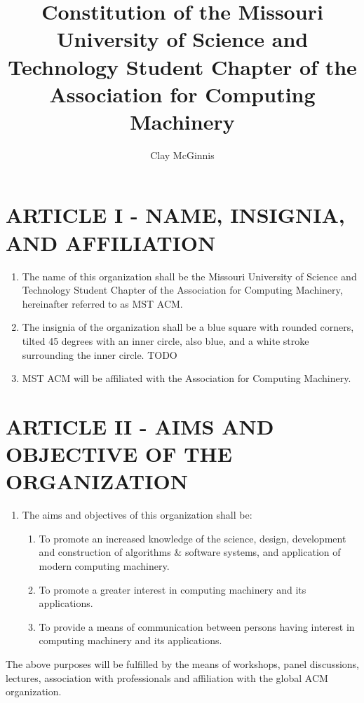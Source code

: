\documentclass[11pt,a4paper,notitlepage]{article}
\author{Clay McGinnis}
\title{Constitution of the Missouri University of Science and Technology Student Chapter of the Association for Computing Machinery}
\begin{document}
\maketitle



\section*{ARTICLE I - NAME, INSIGNIA, AND AFFILIATION}
\begin{enumerate}[label=\Alph*.]
  \item The name of this organization shall be the Missouri University of Science and Technology Student Chapter of the Association for Computing Machinery, hereinafter referred to as MST ACM.
  \item The insignia of the organization shall be a blue square with rounded corners, tilted 45 degrees with an inner circle, also blue, and a white stroke surrounding the inner circle.
    TODO
  \item MST ACM will be affiliated with the Association for Computing Machinery.
\end{enumerate}


\section*{ARTICLE II - AIMS AND OBJECTIVE OF THE ORGANIZATION}
  \begin{enumerate}[label=\Alph*.]
    \item The aims and objectives of this organization shall be:
      \begin{enumerate}[label=\arabic*.]
        \item To promote an increased knowledge of the science, design, development and construction of algorithms \& software systems, and application of modern computing machinery.
        \item To promote a greater interest in computing machinery and its applications.
        \item To provide a means of communication between persons having interest in computing machinery and its applications.
      \end{enumerate}
  \end{enumerate}
The above purposes will be fulfilled by the means of workshops, panel discussions, lectures, association with professionals and affiliation with the global ACM organization.
\end{document}
